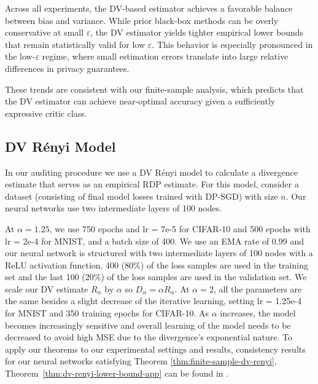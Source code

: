 \documentclass{article}
\theoremstyle{plain}
\theoremstyle{definition}
\theoremstyle{remark}
\begin{document}
Across all experiments, the DV-based estimator achieves a favorable balance between bias and variance.
While prior black-box methods can be overly conservative at small $\varepsilon$,
the DV estimator yields tighter empirical lower bounds that remain statistically valid for low $\varepsilon$.
This behavior is especially pronounced in the low-$\varepsilon$ regime, where small estimation errors
translate into large relative differences in privacy guarantees.

These trends are consistent with our finite-sample analysis,
which predicts that the DV estimator can achieve near-optimal accuracy given a sufficiently expressive critic class.



\subsection{DV R\'enyi Model}
In our auditing procedure we use a DV R\'enyi model to calculate a divergence estimate that serves as an empirical RDP estimate. For this model, consider a dataset (consisting of final model losses trained with DP-SGD) with size $n$. Our neural networks use two intermediate layers of 100 nodes.

At $\alpha = 1.25$, we use 750 epochs and lr = 7e-5 for CIFAR-10 and 500 epochs with lr = 2e-4 for MNIST, and a batch size of 400. We use an EMA rate of 0.99 and our neural network is structured with two intermediate layers of 100 nodes with a ReLU activation function. 400 (80$\%$) of the loss samples are used in the training set and the last 100 (20$\%$) of the loss samples are used in the validation set. We scale our DV estimate $R_\alpha$ by $\alpha$ so $D_\alpha = \alpha R_\alpha$. At $\alpha = 2$, all the parameters are the same besides a slight decrease of the iterative learning, setting lr = 1.25e-4 for MNIST and 350 training epochs for CIFAR-10. As $\alpha$ increases, the model becomes increasingly sensitive and overall learning of the model needs to be decreased to avoid high MSE due to the divergence's exponential nature. To apply our theorems to our experimental settings and results, consistency results for our neural networks satisfying Theorem \ref{thm:finite-sample-dv-renyi}, Theorem~\ref{thm:dv-renyi-lower-bound-app} can be found in \cite{birrell2021variational}.

\end{document}
